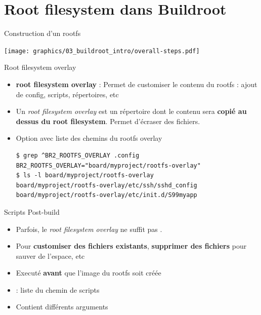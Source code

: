 \documentclass[aspectratio=169,obeyspaces,spaces,hyphens,dvipsnames]{beamer}
\begin{document}
\section{Root filesystem dans Buildroot}

\begin{frame}{Construction d'un rootfs}
  \begin{center}
    \texttt{[image: graphics/03\_buildroot\_intro/overall-steps.pdf]}
  \end{center}
\end{frame}

\begin{frame}[fragile]{Root filesystem overlay}
  \begin{itemize}
  \item  {\bf root filesystem overlay} : Permet de customiser le contenu
    du rootfs : ajout de config, scripts, répertoires, etc
  \item Un {\em root filesystem overlay} est un répertoire dont le contenu sera
    {\bf copié au dessus du root filesystem}. Permet d'écraser des fichiers.
  \item Option  avec liste des chemins du rootfs overlay
    \begin{block}{}
      {\small
\begin{verbatim}
$ grep ^BR2_ROOTFS_OVERLAY .config
BR2_ROOTFS_OVERLAY="board/myproject/rootfs-overlay"
$ ls -l board/myproject/rootfs-overlay
board/myproject/rootfs-overlay/etc/ssh/sshd_config
board/myproject/rootfs-overlay/etc/init.d/S99myapp
\end{verbatim}}
      \end{block}
    \end{itemize}
  \end{frame}

\begin{frame}{Scripts Post-build}
  \begin{itemize}
  \item Parfois, le {\em root filesystem overlay} ne suffit pas
    .
  \item Pour {\bf customiser des fichiers existants}, {\bf supprimer
      des fichiers} pour sauver de l'espace, etc
  \item Executé \textbf{avant} que l'image du rootfs soit créée
  \item {} : liste du chemin de scripts
  \item Contient différents arguments
  \end{itemize}
\end{frame}
\end{document}

